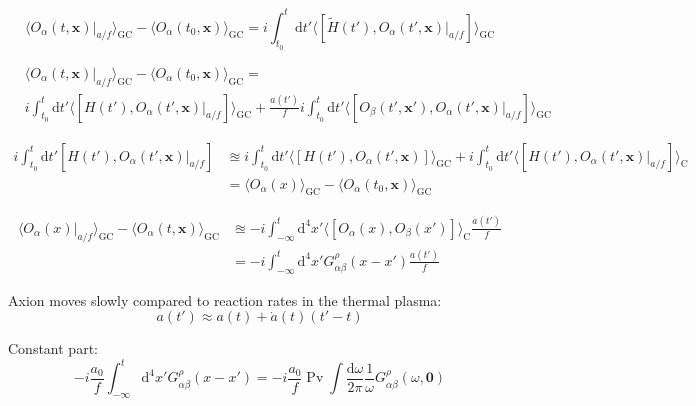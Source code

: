 \documentclass[master,       %
               twoside,        %
               BCOR10mm,       %
               english,ngerman, %
               ]{GAUBM}
\begin{document}
\begin{otherlanguage}{english}
\begin{equation}
	\langle O_\alpha(t, \mathbf{x})|_{a/f} \rangle_{\mathrm{GC}} - \langle O_\alpha(t_0, \mathbf{x}) \rangle_{\mathrm{GC}} = i \int_{t_0}^{t} \mathrm{d} t' \langle [\tilde{H}(t'), O_\alpha(t', \mathbf{x})|_{a / f}] \rangle_{\mathrm{GC}}
\end{equation}


\begin{align}
	& \langle O_\alpha(t, \mathbf{x})|_{a/f} \rangle_{\mathrm{GC}} - \langle O_\alpha(t_0, \mathbf{x}) \rangle_{\mathrm{GC}} = \nonumber \\  & i \int_{t_0}^{t} \mathrm{d} t' \langle [H(t'), O_\alpha(t', \mathbf{x})|_{a / f}] \rangle_{\mathrm{GC}} + \frac{a(t')}{f} i \int_{t_0}^{t} \mathrm{d} t' \langle [O_\beta(t', \mathbf{x}'), O_\alpha(t', \mathbf{x})|_{a / f}] \rangle_{\mathrm{GC}}
\end{align}

\begin{align}
	i \int_{t_0}^{t} \mathrm{d} t' [H(t'), O_\alpha(t', \mathbf{x})|_{a / f}] &\approxeq i \int_{t_0}^{t} \mathrm{d} t' \langle [H(t'), O_\alpha(t', \mathbf{x})] \rangle_{\mathrm{GC}} + i \int_{t_0}^{t} \mathrm{d} t' \langle [H(t'), O_\alpha(t', \mathbf{x})|_{a / f}] \rangle_{\mathrm{C}} \nonumber \\ &= \langle O_\alpha(x) \rangle_{\mathrm{GC}} - \langle O_\alpha(t_0, \mathbf{x}) \rangle_{\mathrm{GC}}	
\end{align}

\begin{align}
	\langle O_\alpha(x)|_{a/f} \rangle_{\mathrm{GC}} - \langle O_\alpha(t, \mathbf{x}) \rangle_{\mathrm{GC}} &\approxeq - i \int_{-  \infty}^t \mathrm{d}^4 x' \langle [ O_\alpha(x), O_\beta(x') ] \rangle_{\mathrm{C}} \frac{a(t')}{f} \nonumber \\ &= - i \int_{-  \infty}^t \mathrm{d}^4 x' G^\rho_{\alpha \beta}(x - x') \frac{a(t')}{f}
\end{align}

Axion moves slowly compared to reaction rates in the thermal plasma: 
\begin{equation}
	a(t') \approx a(t) + \dot{a}(t) (t' - t)
\end{equation}

Constant part:
\begin{equation}
	- i \frac{a_0}{f} \int_{-  \infty}^t \mathrm{d}^4 x' G^\rho_{\alpha \beta}(x - x') = - i \frac{a_0}{f} \operatorname{Pv} \int \frac{\mathrm{d} \omega}{2\pi} \frac{1}{\omega} G^\rho_{\alpha \beta} (\omega, \mathbf{0})
\end{equation}


\end{otherlanguage}
\end{document}
